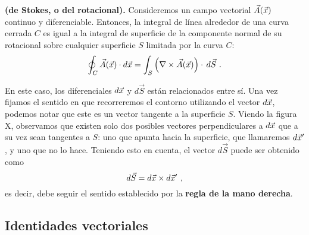 \begin{teorema}{\textbf{(de Stokes, o del rotacional).}} 
    Consideremos un campo vectorial $\vec{A}(\vec{x})$ continuo y diferenciable. Entonces, la integral de línea alrededor de una curva cerrada $C$ es igual a la integral de superficie de la componente normal de su rotacional sobre cualquier superficie $S$ limitada por la curva $C$:
    \begin{equation}
        \oint_C \vec{A}(\x) \cdot d\x =  \int_S \left( \nabla \times \vec{A}(\x) \right) \cdot \, d\vec{S} \ .
    \end{equation}
\end{teorema}

En este caso, los diferenciales $d\vec{x}$ y $d\vec{S}$ están relacionados entre sí. Una vez fijamos el sentido en que recorreremos el contorno utilizando el vector $d\vec{x}$, podemos notar que este es un vector tangente a la superficie $S$. Viendo la figura X, observamos que existen solo dos posibles vectores perpendiculares a $d\vec{x}$ que a su vez sean tangentes a $S$: uno que apunta hacia la superficie, que llamaremos $d\vec{x}'$, y uno que no lo hace. Teniendo esto en cuenta, el vector $d\vec{S}$ puede ser obtenido como 
\begin{equation*}
    d\vec{S} = d\vec{x} \times d\vec{x}' \ ,
\end{equation*}
es decir, debe seguir el sentido establecido por la \textbf{regla de la mano derecha}.

\subsection{Identidades vectoriales}

